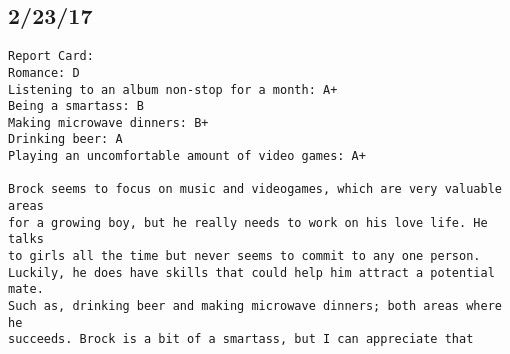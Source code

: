 \documentclass[12pt,letterpaper]{article}
\begin{document}
\subsection*{2/23/17}
\begin{verbatim}
Report Card:
Romance: D
Listening to an album non-stop for a month: A+
Being a smartass: B
Making microwave dinners: B+
Drinking beer: A
Playing an uncomfortable amount of video games: A+

Brock seems to focus on music and videogames, which are very valuable areas
for a growing boy, but he really needs to work on his love life. He talks
to girls all the time but never seems to commit to any one person. 
Luckily, he does have skills that could help him attract a potential mate.
Such as, drinking beer and making microwave dinners; both areas where he 
succeeds. Brock is a bit of a smartass, but I can appreciate that


\end{verbatim}
\end{document}
